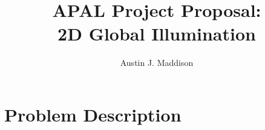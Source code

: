 \documentclass[sigconf, nonacm]{acmart}
\begin{document}
\title{APAL Project Proposal: \\ 2D Global Illumination}

\author{Austin J. Maddison}

\renewcommand{\shortauthors}{\thepage \hspace{5pt}  $\bullet$ \hspace{5pt} APAL Project Proposal: Tour Of 2D Global Illumination Techniques }






\maketitle

\raggedbottom
\section{Problem Description}
\end{document}
